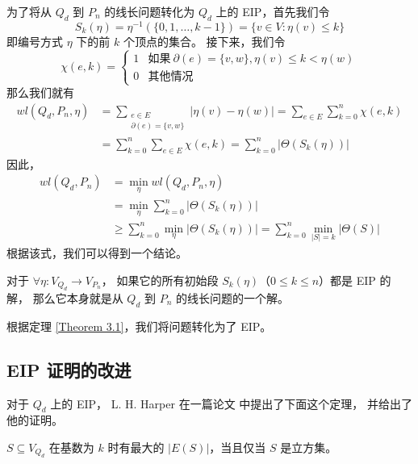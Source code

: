 为了将从 $Q_d$ 到 $P_n$ 的线长问题转化为 $Q_d$ 上的 EIP，首先我们令
\begin{equation}
S_k(\eta) = \eta^{-1}(\{0, 1, \dots, k - 1\}) = \{v \in V \colon \eta(v) \le k\}
\end{equation}
即编号方式 $\eta$ 下的前 $k$ 个顶点的集合。
接下来，我们令
\begin{equation}
\chi(e, k) = \begin{cases}
	1 & \text{如果}\ \partial(e) = \{v, w\}, \eta(v) \le k < \eta(w) \\
	0 & \text{其他情况}
\end{cases}
\end{equation}
那么我们就有
\begin{align}
wl(Q_d, P_n, \eta) & = \sum_{\substack{
			       e \in E \\
			       \partial(e) = \{v, w\}
		       }} |\eta(v) - \eta(w)|
		     = \sum_{e \in E} \sum_{k = 0}^n \chi(e, k) \\
		   & = \sum_{k = 0}^n \sum_{e \in E} \chi(e, k)
		     = \sum_{k = 0}^n |\Theta(S_k(\eta))|
\end{align}
因此，
\begin{align}
wl(Q_d, P_n) & = \min_{\eta} wl(Q_d, P_n, \eta) \\
	     & = \min_{\eta} \sum_{k = 0}^n |\Theta(S_k(\eta))| \\
	     & \ge \sum_{k = 0}^n \min_{\eta} |\Theta(S_k(\eta))|
	       = \sum_{k = 0}^n \min_{|S| = k} |\Theta(S)|
\end{align}
根据该式，我们可以得到一个结论。

\begin{theorem}
\label{Theorem 3.1}
对于 $\forall \eta \colon V_{Q_d} \rightarrow V_{P_n}$，
如果它的所有初始段 $S_k(\eta)$（$0 \le k \le n$）都是 EIP 的解，
那么它本身就是从 $Q_d$ 到 $P_n$ 的线长问题的一个解。
\end{theorem}

根据定理 \ref{Theorem 3.1}，我们将问题转化为了 EIP。

\subsection{EIP 证明的改进}
\label{Subsection 3.1.3}

对于 $Q_d$ 上的 EIP，
L. H. Harper 在一篇论文 \cite{Harper.1964} 中提出了下面这个定理，
并给出了他的证明。

\begin{theorem}
\label{Theorem 3.2}
$S \subseteq V_{Q_d}$ 在基数为 $k$ 时有最大的 $|E(S)|$，当且仅当 $S$ 是立方集。
\end{theorem}

